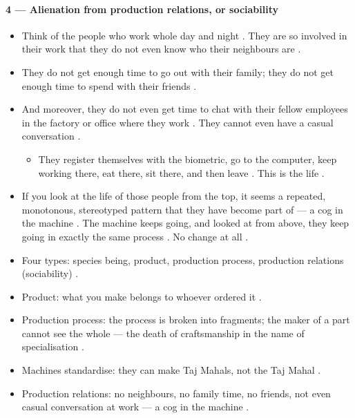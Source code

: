\paragraph{4 --- Alienation from production relations, or sociability}
\begin{itemize}
    \item Think of the people who work whole day and night . They are so involved in their work that they do not even know who their neighbours are .
    \item They do not get enough time to go out with their family; they do not get enough time to spend with their friends .
    \item And moreover, they do not even get time to chat with their fellow employees in the factory or office where they work . They cannot even have a casual conversation .
    \begin{itemize}
        \item They register themselves with the biometric, go to the computer, keep working there, eat there, sit there, and then leave . This is the life .
    \end{itemize}
    \item If you look at the life of those people from the top, it seems a repeated, monotonous, stereotyped pattern that they have become part of --- a cog in the machine . The machine keeps going, and looked at from above, they keep going in exactly the same process . No change at all .
\end{itemize}

\begin{QuickRevision}
\begin{itemize}
    \item Four types: species being, product, production process, production relations (sociability) .
    \item Product: what you make belongs to whoever ordered it .
    \item Production process: the process is broken into fragments; the maker of a part cannot see the whole --- the death of craftsmanship in the name of specialisation .
    \item Machines standardise: they can make Taj Mahals, not the Taj Mahal .
    \item Production relations: no neighbours, no family time, no friends, not even casual conversation at work --- a cog in the machine .
\end{itemize}
\end{QuickRevision}

